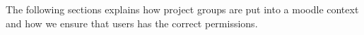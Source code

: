 The following sections explains how project groups are put into a moodle context and how we ensure that users has the correct permissions.


\FloatBarrier


\FloatBarrier











